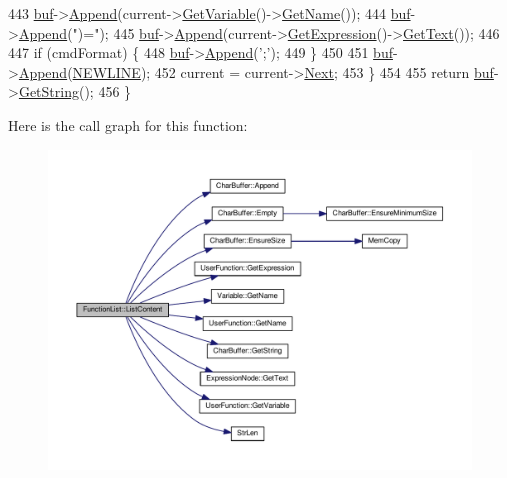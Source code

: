 \begin{DoxyCode}
443         \hyperlink{classFunctionList_aa69c3feda1c4a6133fe821982b418c39}{buf}->\hyperlink{classCharBuffer_a045b38735f7b3007c1b98d3d7b7feafe}{Append}(current->\hyperlink{classUserFunction_a4580afdaa5124951a523de07f3c454a6}{GetVariable}()->\hyperlink{classVariable_accf221d35cec8a9707e84891b715fb6c}{GetName}());
444         \hyperlink{classFunctionList_aa69c3feda1c4a6133fe821982b418c39}{buf}->\hyperlink{classCharBuffer_a045b38735f7b3007c1b98d3d7b7feafe}{Append}(\textcolor{stringliteral}{")="});
445         \hyperlink{classFunctionList_aa69c3feda1c4a6133fe821982b418c39}{buf}->\hyperlink{classCharBuffer_a045b38735f7b3007c1b98d3d7b7feafe}{Append}(current->\hyperlink{classUserFunction_a41abe1afc9d481786b78ce7d7ffbde80}{GetExpression}()->\hyperlink{classExpressionNode_a0bbf243108a14eaf963a8161ffd8eb92}{GetText}());
446 
447         \textcolor{keywordflow}{if} (cmdFormat) \{
448             \hyperlink{classFunctionList_aa69c3feda1c4a6133fe821982b418c39}{buf}->\hyperlink{classCharBuffer_a045b38735f7b3007c1b98d3d7b7feafe}{Append}(\textcolor{charliteral}{';'});
449         \}
450 
451         \hyperlink{classFunctionList_aa69c3feda1c4a6133fe821982b418c39}{buf}->\hyperlink{classCharBuffer_a045b38735f7b3007c1b98d3d7b7feafe}{Append}(\hyperlink{platform_8h_a806511f4930171733227c99101dc0606}{NEWLINE});
452         current = current->\hyperlink{classUserFunction_a5463f575d2ed50c0dbe069ec2841a5c9}{Next};
453     \}
454 
455     \textcolor{keywordflow}{return} \hyperlink{classFunctionList_aa69c3feda1c4a6133fe821982b418c39}{buf}->\hyperlink{classCharBuffer_a7dfd3feaaf80f318ba44efe15b1ec44b}{GetString}();
456 \}
\end{DoxyCode}


Here is the call graph for this function\+:
\nopagebreak
\begin{figure}[H]
\begin{center}
\leavevmode
\includegraphics[width=350pt]{d1/d79/classFunctionList_ac87c5ecfbdfd7aa7c9c8c611b70c3a63_cgraph}
\end{center}
\end{figure}




